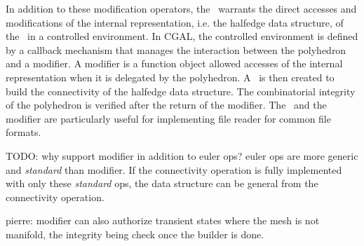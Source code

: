In addition to these modification operators, the \polybuilder\
warrants the direct accesses and modifications of the internal
representation, i.e. the halfedge data structure, of the \poly\ in a
controlled environment. In CGAL, the controlled environment is defined
by a callback mechanism that manages the interaction between the
polyhedron and a modifier.  A modifier is a function object allowed
accesses of the internal representation when it is delegated by the
polyhedron. A \polybuilder\ is then created to build the connectivity
of the halfedge data structure.  The combinatorial integrity of the
polyhedron is verified after the return of the modifier. The
\polybuilder\ and the modifier are particularly useful for
implementing file reader for common file formats.

TODO: why support modifier in addition to euler ops? euler ops are
more generic and \emph{standard} than modifier. If the connectivity
operation is fully implemented with only these \emph{standard} ops,
the data structure can be general from the connectivity operation.

pierre: modifier can also authorize transient states where the mesh is
not manifold, the integrity being check once the builder is done.
